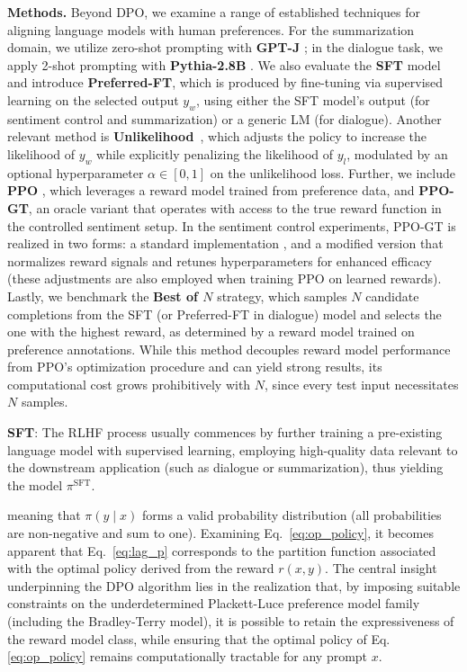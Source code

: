 \textbf{Methods.} Beyond DPO, we examine a range of established techniques for aligning language models with human preferences. For the summarization domain, we utilize zero-shot prompting with \textbf{GPT-J} \citep{gpt-j}; in the dialogue task, we apply 2-shot prompting with \textbf{Pythia-2.8B} \citep{biderman2023pythia}. We also evaluate the \textbf{SFT} model and introduce \textbf{Preferred-FT}, which is produced by fine-tuning via supervised learning on the selected output $y_w$, using either the SFT model’s output (for sentiment control and summarization) or a generic LM (for dialogue). Another relevant method is \textbf{Unlikelihood}~\citep{welleck2019neural}, which adjusts the policy to increase the likelihood of $y_w$ while explicitly penalizing the likelihood of $y_l$, modulated by an optional hyperparameter $\alpha\in[0,1]$ on the unlikelihood loss. Further, we include \textbf{PPO} \citep{schulman2017proximal}, which leverages a reward model trained from preference data, and \textbf{PPO-GT}, an oracle variant that operates with access to the true reward function in the controlled sentiment setup. In the sentiment control experiments, PPO-GT is realized in two forms: a standard implementation \cite{leandro_von_werra_2023_7790115}, and a modified version that normalizes reward signals and retunes hyperparameters for enhanced efficacy (these adjustments are also employed when training PPO on learned rewards). Lastly, we benchmark the \textbf{Best of $N$} strategy, which samples $N$ candidate completions from the SFT (or Preferred-FT in dialogue) model and selects the one with the highest reward, as determined by a reward model trained on preference annotations. While this method decouples reward model performance from PPO’s optimization procedure and can yield strong results, its computational cost grows prohibitively with $N$, since every test input necessitates $N$ samples.

\textbf{SFT}: The RLHF process usually commences by further training a pre-existing language model with supervised learning, employing high-quality data relevant to the downstream application (such as dialogue or summarization), thus yielding the model $\pi^\text{SFT}$.

meaning that $\pi(y\mid x)$ forms a valid probability distribution (all probabilities are non-negative and sum to one). Examining Eq.~\ref{eq:op_policy}, it becomes apparent that Eq.~\ref{eq:lag_p} corresponds to the partition function associated with the optimal policy derived from the reward $r(x, y)$. The central insight underpinning the DPO algorithm lies in the realization that, by imposing suitable constraints on the underdetermined Plackett-Luce preference model family (including the Bradley-Terry model), it is possible to retain the expressiveness of the reward model class, while ensuring that the optimal policy of Eq. \ref{eq:op_policy} remains computationally tractable for any prompt $x$.

